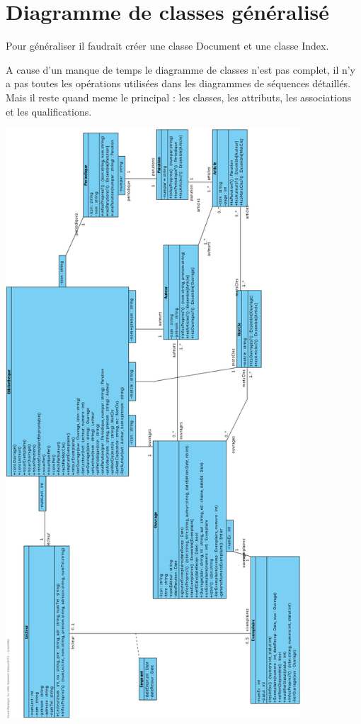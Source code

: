 \documentclass[a4paper,10pt]{report}
\begin{document}
\section*{Diagramme de classes généralisé}
\bigskip
\bigskip
\begin{flushleft}
Pour généraliser il faudrait créer une classe Document et une classe Index.

A cause d'un manque de temps le diagramme de classes n'est pas complet, il n'y a pas toutes les opérations utilisées dans les diagrammes de séquences détaillés. Mais il reste quand meme le principal : les classes, les attributs, les associations et les qualifications.\\
\end{flushleft}
\includegraphics[height=220mm]{diagrammeDeClassePartiel.png}
\end{document}
